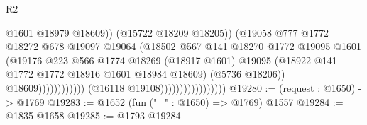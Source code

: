 \begin{lexlean}{R2}
\begin{coremodule}
                                                              @1601
                                                              @18979
                                                              @18609))
                                                          (@15722 @18209 @18205))
                                                        (@19058
                                                          @777
                                                          @1772
                                                          @18272
                                                          @678
                                                          @19097
                                                          @19064
                                                          (@18502
                                                            @567
                                                            @141
                                                            @18270
                                                            @1772
                                                            @19095
                                                            @1601
                                                            (@19176
                                                              @223
                                                              @566
                                                              @1774
                                                              @18269
                                                              (@18917 @1601)
                                                              @19095
                                                              (@18922
                                                                @141
                                                                @1772
                                                                @1772
                                                                @18916
                                                                @1601
                                                                @18984
                                                                @18609)
                                                              (@5736 @18206))
                                                            @18609))))))))))))
                                    (@16118 @19108)))))))))))))))))
@19280 := (request : @1650) -> @1769
@19283 := @1652 (fun ("_" : @1650) => @1769) @1557
@19284 := @1835 @1658
@19285 := @1793 @19284

\end{coremodule}
\end{lexlean}
